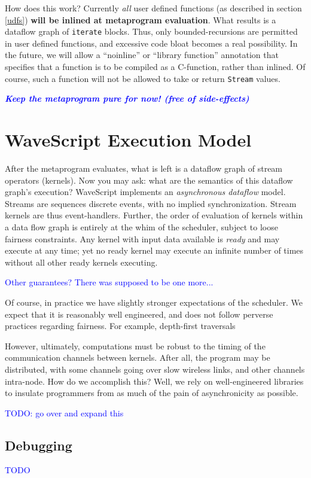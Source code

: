 \documentclass[twocolumn]{report}
\newcommand{\rednote}[1]{{\textcolor{blue}{#1}}}
\begin{document}
How does this work?  Currently {\em all} user defined functions (as
described in section \ref{udfs}) {\bf will be inlined at metaprogram
evaluation}.  What results is a dataflow graph of {\tt iterate} blocks.
Thus, only bounded-recursions are permitted in user defined functions,
and excessive code bloat becomes a real possibility.  In the future, we will
allow a ``noinline'' or ``library function'' annotation that specifies
that a function is to be compiled as a C-function, rather than
inlined.  Of course, such a function will not be allowed to take or
return {\tt Stream} values.

\rednote{\em \bf Keep the metaprogram pure for now! (free of side-effects)}

\chapter{WaveScript Execution Model}

After the metaprogram evaluates, what is left is a dataflow graph of
stream operators (kernels).  Now you may ask: what are the semantics
of this dataflow graph's execution?  WaveScript implements an {\em
asynchronous dataflow} model.  Streams are sequences discrete events,
with no implied synchronization.  Stream kernels are thus
event-handlers.  Further, the order of evaluation of kernels within a
data flow graph is entirely at the whim of the scheduler, subject to
loose fairness constraints.  Any kernel with input data available is
{\em ready} and may execute at any time; yet no ready kernel may
execute an infinite number of times without all other ready kernels
executing.

\rednote{Other guarantees?  There was supposed to be one more...}

Of course, in practice we have slightly stronger expectations of the
scheduler.  We expect that it is reasonably well engineered, and does not
follow perverse practices regarding fairness.  For example,
depth-first traversals

However, ultimately, computations must be robust to the timing of the
communication channels between kernels.  After all, the program may be
distributed, with some channels going over slow wireless links, and
other channels intra-node.  How do we accomplish this?  Well, we rely
on well-engineered libraries to insulate programmers from as much of
the pain of asynchronicity as possible.

\rednote{TODO: go over and expand this}

\section{Debugging}

\rednote{TODO}


\end{document}

